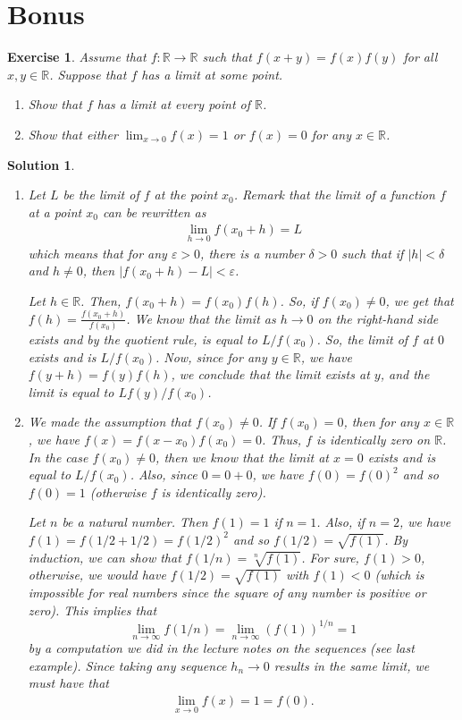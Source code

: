 \documentclass[12pt]{article}
\newcommand{\bR}{\mathbb{R}}
\newcommand{\ra}{\rightarrow}
\theoremstyle{plain}
\newtheorem{exer}{\textbf{Exercise}}}
\theoremstyle{plain}
\newtheorem*{sol}{\textbf{Solution}}}
\theoremstyle{plain}
\theoremstyle{plain}
\begin{document}
\section{Bonus}
\begin{exer}
Assume that $f : \bR \ra \bR$ such that $f(x + y) = f(x) f(y)$ for all $x, y \in \bR$. Suppose that $f$ has a limit at some point.
	\begin{enumerate}[label=\textbf{\alph*)}]
	\item Show that $f$ has a limit at every point of $\bR$.
	\item Show that either $\lim_{x \ra 0} f(x) = 1$ or $f(x) = 0$ for any $x \in \bR$.
	\end{enumerate}
\end{exer}
\begin{sol}
\begin{enumerate}[label=\textbf{\alph*)}]
\item Let $L$ be the limit of $f$ at the point $x_0$. Remark that the limit of a function $f$ at a point $x_0$ can be rewritten as
	\begin{align*}
	\lim_{h \ra 0} f (x_0 + h)  = L 
	\end{align*}
which means that for any $\varepsilon > 0$, there is a number $\delta > 0$ such that if $|h| < \delta$ and $h \neq 0$, then $|f(x_0 + h) - L| < \varepsilon$.

 Let $h \in \bR$. Then, $f(x_0 + h) = f(x_0) f(h)$. So, if $f(x_0) \neq 0$, we get that $f(h) = \frac{f(x_0 + h)}{f(x_0)}$. We know that the limit as $h \ra 0$ on the right-hand side exists and by the quotient rule, is equal to $L/f(x_0)$. So, the limit of $f$ at $0$ exists and is $L/f(x_0)$. Now, since for any $y \in \bR$, we have $f(y + h) = f(y) f(h)$, we conclude that the limit exists at $y$, and the limit is equal to $L f(y)/f(x_0)$.
 
\item We made the assumption that $f(x_0) \neq 0$. If $f(x_0) = 0$, then for any $x \in \bR$, we have $f(x) = f(x - x_0) f(x_0) = 0$. Thus, $f$ is identically zero on $\bR$. In the case $f(x_0 ) \neq 0$, then we know that the limit at $x = 0$ exists and is equal to $L/f(x_0)$. Also, since $0 = 0 + 0$, we have $f(0) = f(0)^2$ and so $f(0) = 1$ (otherwise $f$ is identically zero). 

Let $n$ be a natural number. Then $f(1) = 1$ if $n = 1$. Also, if $n = 2$, we have $f(1) = f(1/2 + 1/2) = f(1/2)^2$ and so $f(1/2) = \sqrt{f(1)}$. By induction, we can show that $f(1/n) = \sqrt[n]{f(1)}$. For sure, $f(1) > 0$, otherwise, we would have $f(1/2) = \sqrt{f(1)}$ with $f(1) < 0$ (which is impossible for real numbers since the square of any number is positive or zero). This implies that 
	$$
	\lim_{n \ra \infty} f(1/n) = \lim_{n \ra \infty} (f(1))^{1/n} = 1
	$$
by a computation we did in the lecture notes on the sequences (see last example). Since taking any sequence $h_n \ra 0$ results in the same limit, we must have that
	\begin{align*}
	\lim_{x \ra 0} f(x) = 1 = f(0) .
	\end{align*}
\end{enumerate}
\end{sol}
\end{document}
